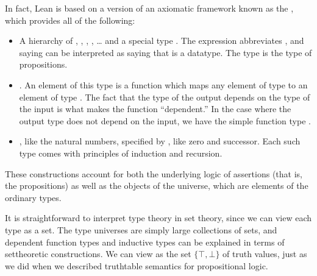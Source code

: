 \documentclass[letterpaper,10pt,english]{sphinxmanual}
\begin{document}
\sphinxAtStartPar
In fact, Lean is based on a version of an axiomatic framework known as the , which provides all of the following:
\begin{itemize}
\item {} 
\sphinxAtStartPar
A hierarchy of , , , , … and a special type . The expression  abbreviates , and saying  can be interpreted as saying that  is a datatype. The type  is the type of propositions.

\item {} 
\sphinxAtStartPar
{} . An element  of this type is a function which maps any element  of type  to an element  of type . The fact that the type of the output depends on the type of the input is what makes the function “dependent.” In the case where the output type does not depend on the input, we have the simple function type .

\item {} 
\sphinxAtStartPar
{}, like the natural numbers, specified by , like zero and successor. Each such type comes with principles of induction and recursion.

\end{itemize}

\sphinxAtStartPar
These constructions account for both the underlying logic of assertions (that is, the propositions) as well as the objects of the universe, which are elements of the ordinary types.

\sphinxAtStartPar
It is straightforward to interpret type theory in set theory, since we can view each type as a set. The type universes are simply large collections of sets, and dependent function types and inductive types can be explained in terms of set\sphinxhyphen{}theoretic constructions. We can view  as the set \(\{ \top, \bot \}\) of truth values, just as we did when we described truth\sphinxhyphen{}table semantics for propositional logic.
\end{document}
